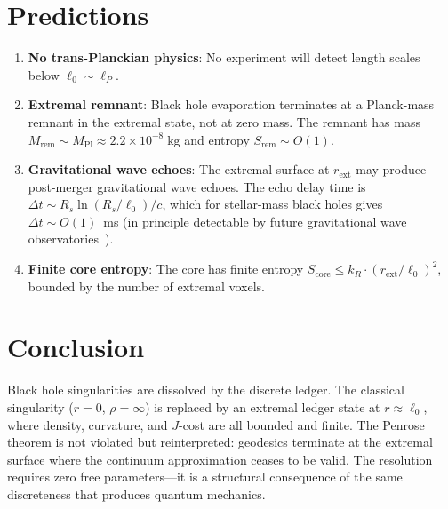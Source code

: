\documentclass[12pt,a4paper]{article}
\theoremstyle{definition}
\theoremstyle{remark}
\begin{document}
\section{Predictions}
\label{sec:predictions}

\begin{enumerate}
  \item \textbf{No trans-Planckian physics}: No experiment
  will detect length scales below $\ell_0 \sim \ell_P$.

  \item \textbf{Extremal remnant}: Black hole evaporation
  terminates at a Planck-mass remnant in the extremal
  state, not at zero mass.  The remnant has mass
  $M_{\mathrm{rem}} \sim M_{\mathrm{Pl}} \approx
  2.2 \times 10^{-8}\;\mathrm{kg}$ and entropy
  $S_{\mathrm{rem}} \sim O(1)$.

  \item \textbf{Gravitational wave echoes}: The extremal
  surface at $r_{\mathrm{ext}}$ may produce post-merger
  gravitational wave echoes.  The echo delay time is
  $\Delta t \sim R_s \ln(R_s/\ell_0)/c$, which for
  stellar-mass black holes gives $\Delta t \sim O(1)$~ms
  (in principle detectable by future gravitational wave
  observatories~\cite{Abedi2017}).

  \item \textbf{Finite core entropy}: The core has finite
  entropy $S_{\mathrm{core}} \leq k_R \cdot
  (r_{\mathrm{ext}}/\ell_0)^2$, bounded by the number
  of extremal voxels.
\end{enumerate}

\section{Conclusion}
\label{sec:conclusion}

Black hole singularities are dissolved by the discrete ledger.  The
classical singularity ($r = 0$, $\rho = \infty$) is replaced by an
extremal ledger state at $r \approx \ell_0$, where density, curvature,
and $J$-cost are all bounded and finite.  The Penrose theorem is not
violated but reinterpreted: geodesics terminate at the extremal surface
where the continuum approximation ceases to be valid.  The resolution
requires zero free parameters---it is a structural consequence of the
same discreteness that produces quantum mechanics.
\end{document}
